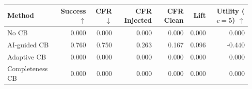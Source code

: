 \begin{tabular}{lrrrrrr}
\toprule
Method & Success $\uparrow$ & CFR $\downarrow$ & CFR Injected & CFR Clean & Lift & Utility ($c=5$) $\uparrow$ \\
\midrule
No CB & 0.000 & 0.000 & 0.000 & 0.000 & 0.000 & 0.000 \\
AI-guided CB & 0.760 & 0.750 & 0.263 & 0.167 & 0.096 & -0.440 \\
Adaptive CB & 0.000 & 0.000 & 0.000 & 0.000 & 0.000 & 0.000 \\
Completeness CB & 0.000 & 0.000 & 0.000 & 0.000 & 0.000 & 0.000 \\
\bottomrule
\end{tabular}
